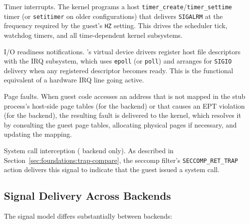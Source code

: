 \begin{description}[style=nextline]
  \item[\texttt{SIGALRM}:]
    Timer interrupts.  The \UML{} kernel programs a host
    \texttt{timer\_create}/\texttt{timer\_settime} timer (or
    \texttt{setitimer} on older configurations) that delivers
    \texttt{SIGALRM} at the frequency required by the guest's
    \texttt{HZ} setting.  This drives the scheduler tick, watchdog
    timers, and all time-dependent kernel subsystems.

  \item[\texttt{SIGIO}:]
    I/O readiness notifications.  \UML{}'s virtual device drivers
    register host file descriptors with the \UML{} IRQ subsystem,
    which uses \texttt{epoll} (or \texttt{poll}) and arranges for
    \texttt{SIGIO} delivery when any registered descriptor becomes
    ready.  This is the functional equivalent of a hardware IRQ
    line going active.

  \item[\texttt{SIGSEGV}:]
    Page faults.  When guest code accesses an address that is not
    mapped in the stub process's host-side page tables (for the
    \Seccomp{} backend) or that causes an EPT violation (for the
    \KVM{} backend), the resulting fault is delivered to the \UML{}
    kernel, which resolves it by consulting the guest page tables,
    allocating physical pages if necessary, and updating the mapping.

  \item[\texttt{SIGSYS}:]
    System call interception (\Seccomp{} backend only).  As described
    in Section~\ref{sec:foundations:trap-compare}, the seccomp filter's
    \texttt{SECCOMP\_RET\_TRAP} action delivers this signal to indicate
    that the guest issued a system call.
\end{description}

\subsection{Signal Delivery Across Backends}

The signal model differs substantially between backends:

